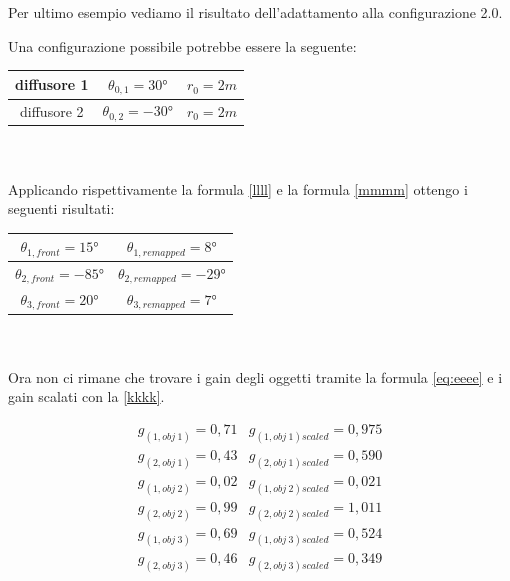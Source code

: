\documentclass[12pt,a4paper]{report}
\begin{document}
Per ultimo esempio vediamo il risultato dell'adattamento alla configurazione 2.0.

Una configurazione possibile potrebbe essere la seguente:
\\

\begin{tabular}{|c|c|c|}
\hline
diffusore 1 & $\theta_{0,1}=30°$ & $r_0=2m$\\
\hline
diffusore 2 & $\theta_{0,2}=-30°$ & $r_0=2m$\\
\hline
\end{tabular} \\
\\

Applicando rispettivamente la formula \ref{llll} e la formula \ref{mmmm} ottengo i seguenti risultati:


\begin{tabular}{|c|c|}
\hline
$\theta_{1,front} = 15°$     & $\theta_{1,remapped} =  8°  $   \\
\hline
$\theta_{2,front} = -85°$     & $\theta_{2,remapped} = -29° $     \\
\hline
$\theta_{3,front} = 20°$    & $ \theta_{3,remapped} =  7° $    \\
\hline
\end{tabular} \\
\\

Ora non ci rimane che trovare i gain degli oggetti tramite la formula \ref{eq:eeee} e i gain scalati con la \ref{kkkk}.

\begin{equation}
\begin{matrix}
g_{(1,obj\ 1)} = 0,71 & g_{(1,obj\ 1)scaled} = 0,975\\
g_{(2,obj\ 1)} = 0,43 & g_{(2,obj\ 1)scaled} = 0,590\\
g_{(1,obj\ 2)} = 0,02 & g_{(1,obj\ 2)scaled} = 0,021\\
g_{(2,obj\ 2)} = 0,99 & g_{(2,obj\ 2)scaled} = 1,011\\
g_{(1,obj\ 3)} = 0,69 & g_{(1,obj\ 3)scaled} = 0,524\\
g_{(2,obj\ 3)} = 0,46 & g_{(2,obj\ 3)scaled} = 0,349\\
\end{matrix}
\label{gscalatiesempio3}
\end{equation}
\end{document}
